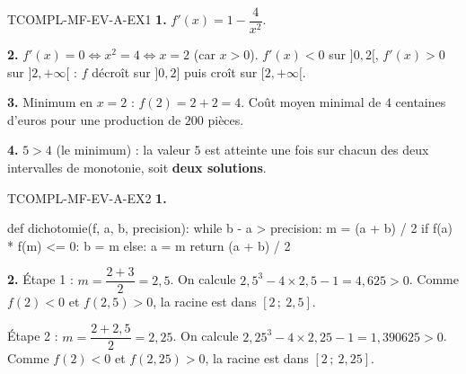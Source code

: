 %
\begin{corrige}{TCOMPL-MF-EV-A-EX1}
\textbf{1.} $f'(x) = 1 - \dfrac{4}{x^2}$.

\textbf{2.} $f'(x)=0 \iff x^2=4 \iff x=2$ (car $x>0$). $f'(x)<0$ sur $]0,2[$, $f'(x)>0$ sur $]2,+\infty[$ : $f$ décroît sur $]0,2]$ puis croît sur $[2,+\infty[$.

\textbf{3.} Minimum en $x=2$ : $f(2)=2+2=4$. Coût moyen minimal de $4$ centaines d'euros pour une production de $200$ pièces.

\textbf{4.} $5>4$ (le minimum) : la valeur $5$ est atteinte une fois sur chacun des deux intervalles de monotonie, soit \textbf{deux solutions}.
\end{corrige}

\begin{corrige}{TCOMPL-MF-EV-A-EX2}
\textbf{1.}
\begin{python}
def dichotomie(f, a, b, precision):
    while b - a > precision:
        m = (a + b) / 2
        if f(a) * f(m) <= 0:
            b = m
        else:
            a = m
    return (a + b) / 2
\end{python}

\textbf{2.} Étape 1 : $m = \dfrac{2+3}{2} = 2{,}5$. On calcule $2{,}5^3 - 4\times2{,}5 - 1 = 4{,}625 > 0$. Comme $f(2)<0$ et $f(2{,}5)>0$, la racine est dans $[2\,;\ 2{,}5]$.

Étape 2 : $m = \dfrac{2+2{,}5}{2} = 2{,}25$. On calcule $2{,}25^3 - 4\times2{,}25 - 1 = 1{,}390625 > 0$. Comme $f(2)<0$ et $f(2{,}25)>0$, la racine est dans $[2\,;\ 2{,}25]$.
\end{corrige}
